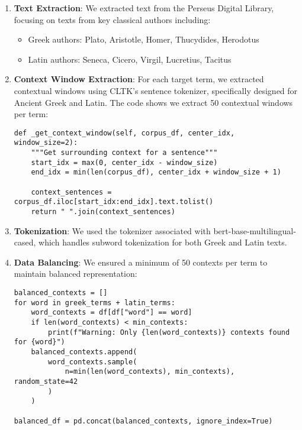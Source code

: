 \documentclass[11pt]{article} %
\begin{document}
\begin{enumerate}
    \item \textbf{Text Extraction}: We extracted text from the Perseus Digital Library, focusing on texts from key classical authors including:
        \begin{itemize}
            \item Greek authors: Plato, Aristotle, Homer, Thucydides, Herodotus
            \item Latin authors: Seneca, Cicero, Virgil, Lucretius, Tacitus
        \end{itemize}
    
    \item \textbf{Context Window Extraction}: For each target term, we extracted contextual windows using CLTK's sentence tokenizer, specifically designed for Ancient Greek and Latin. The code shows we extract 50 contextual windows per term:

\begin{lstlisting}[style=python]
def _get_context_window(self, corpus_df, center_idx, window_size=2):
    """Get surrounding context for a sentence"""
    start_idx = max(0, center_idx - window_size)
    end_idx = min(len(corpus_df), center_idx + window_size + 1)

    context_sentences = corpus_df.iloc[start_idx:end_idx].text.tolist()
    return " ".join(context_sentences)
\end{lstlisting}

    \item \textbf{Tokenization}: We used the tokenizer associated with bert-base-multilingual-cased, which handles subword tokenization for both Greek and Latin texts.
    
    \item \textbf{Data Balancing}: We ensured a minimum of 50 contexts per term to maintain balanced representation:

\begin{lstlisting}[style=python]
balanced_contexts = []
for word in greek_terms + latin_terms:
    word_contexts = df[df["word"] == word]
    if len(word_contexts) < min_contexts:
        print(f"Warning: Only {len(word_contexts)} contexts found for {word}")
    balanced_contexts.append(
        word_contexts.sample(
            n=min(len(word_contexts), min_contexts), random_state=42
        )
    )

balanced_df = pd.concat(balanced_contexts, ignore_index=True)
\end{lstlisting}

\end{enumerate}
\end{document}
